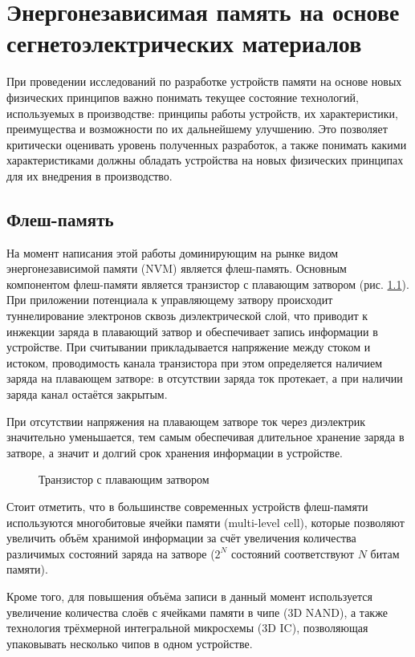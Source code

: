\chapter{Энергонезависимая память на основе сегнетоэлектрических материалов}\label{ch:ch1}
При проведении исследований по разработке устройств памяти на основе новых физических принципов важно понимать текущее состояние технологий, используемых в производстве: принципы работы устройств, их характеристики, преимущества и возможности по их дальнейшему улучшению. Это позволяет критически оценивать уровень полученных разработок, а также понимать какими характеристиками должны обладать устройства на новых физических принципах для их внедрения в производство.
\section{Флеш-память}\label{sec:ch1/sec1}
На момент написания этой работы доминирующим на рынке видом энергонезависимой памяти (NVM) является флеш-память. Основным компонентом флеш-памяти является транзистор с плавающим затвором (рис. \cref{fig:floating_gate_transistor}). При приложении потенциала к управляющему затвору происходит туннелирование электронов сквозь диэлектрической слой, что приводит к инжекции заряда в плавающий затвор и обеспечивает запись информации в устройстве. При считывании прикладывается напряжение между стоком и истоком, проводимость канала транзистора при этом определяется наличием заряда на плавающем затворе: в отсутствии заряда ток протекает, а при наличии заряда канал остаётся закрытым.

При отсутствии напряжения на плавающем затворе ток через диэлектрик значительно уменьшается, тем самым обеспечивая длительное хранение заряда в затворе, а значит и долгий срок хранения информации в устройстве.

\begin{figure}[ht]
    \caption{Транзистор с плавающим затвором}\label{fig:floating_gate_transistor}
\end{figure}

Стоит отметить, что в большинстве современных устройств флеш-памяти используются многобитовые ячейки памяти (multi-level cell), которые позволяют увеличить объём хранимой информации за счёт увеличения количества различимых состояний заряда на затворе (\(2^N\) состояний соответствуют \(N\) битам памяти).

Кроме того, для повышения объёма записи в данный момент используется увеличение количества слоёв с ячейками памяти в чипе (3D NAND), а также технология трёхмерной интегральной микросхемы (3D IC), позволяющая упаковывать несколько чипов в одном устройстве.

